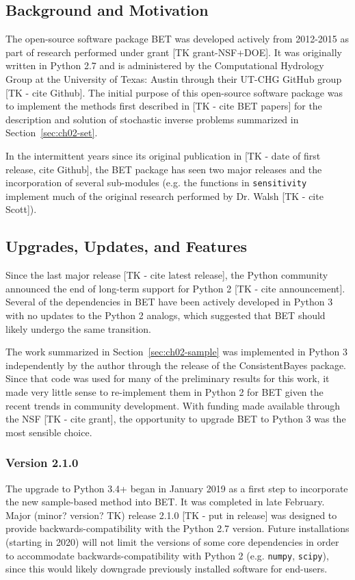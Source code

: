 \subsection{Background and Motivation}
The open-source software package BET was developed actively from 2012-2015 as part of research performed under grant [TK grant-NSF+DOE].
It was originally written in Python 2.7 and is administered by the Computational Hydrology Group at the University of Texas: Austin through their UT-CHG GitHub group [TK - cite Github].
The initial purpose of this open-source software package was to implement the methods first described in [TK - cite BET papers] for the description and solution of stochastic inverse problems summarized in Section~\ref{sec:ch02-set}.

In the intermittent years since its original publication in [TK - date of first release, cite Github], the BET package has seen two major releases and the incorporation of several sub-modules (e.g. the functions in {\tt sensitivity} implement much of the original research performed by Dr. Walsh [TK - cite Scott]).


\subsection{Upgrades, Updates, and Features}
Since the last major release [TK - cite latest release], the Python community announced the end of long-term support for Python 2 [TK - cite announcement].
Several of the dependencies in BET have been actively developed in Python 3 with no updates to the Python 2 analogs, which suggested that BET should likely undergo the same transition.

The work summarized in Section~\ref{sec:ch02-sample} was implemented in Python 3 independently by the author through the release of the ConsistentBayes package.
Since that code was used for many of the preliminary results for this work, it made very little sense to re-implement them in Python 2 for BET given the recent trends in community development.
With funding made available through the NSF [TK - cite grant], the opportunity to upgrade BET to Python 3 was the most sensible choice.


\subsubsection{Version 2.1.0}
The upgrade to Python 3.4+ began in January 2019 as a first step to incorporate the new sample-based method into BET.
It was completed in late February.
Major (minor? version? TK) release 2.1.0 [TK - put in release] was designed to provide backwards-compatibility with the Python 2.7 version.
Future installations (starting in 2020) will not limit the versions of some core dependencies in order to accommodate backwards-compatibility with Python 2 (e.g. {\tt numpy}, {\tt scipy}), since this would likely downgrade previously installed software for end-users.



